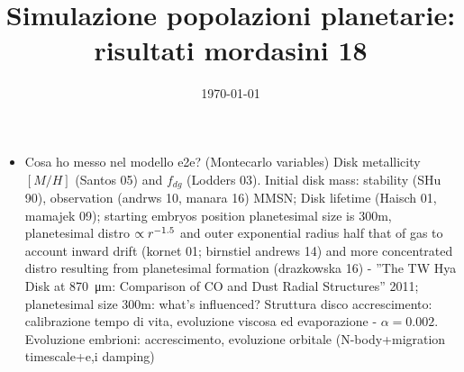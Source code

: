 \documentclass[twoside,11pt,fleqn]{memoir}%
\author{ }
\title{Simulazione popolazioni planetarie: risultati mordasini 18}
\date{\today}
\begin{document}
\maketitle

\begin{workout}
\begin{itemize}
\item Cosa ho messo nel modello e2e? (Montecarlo variables) Disk metallicity $[M/H]$ (Santos 05) and $f_{dg}$ (Lodders 03). Initial disk mass: stability (SHu 90), observation (andrws 10, manara 16) MMSN; Disk lifetime (Haisch 01, mamajek 09); starting embryos position
planetesimal size is 300m, planetesimal distro $\propto r^{-1.5}$ and outer exponential radius half that of gas to account inward drift (kornet 01; birnstiel andrews 14) and more concentrated distro resulting from planetesimal formation (drazkowska 16) - ''The TW Hya Disk at \SI{870}{\micro\meter}:  Comparison of CO and Dust Radial Structures'' 2011; planetesimal size 300m: what's influenced?
Struttura disco accrescimento: calibrazione tempo di vita, evoluzione viscosa ed evaporazione - $\alpha=0.002$.
Evoluzione embrioni: accrescimento, evoluzione orbitale (N-body+migration timescale+e,i damping)


\end{itemize}
\end{workout}
\end{document}
